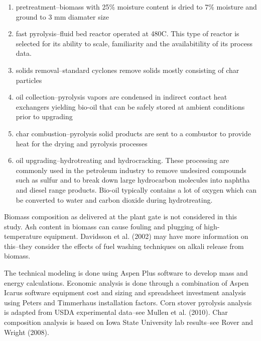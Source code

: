 \documentclass{article}\usepackage[]{graphicx}\usepackage[]{color}
\begin{document}
\begin{enumerate}
\item pretreatment--biomass with 25\% moisture content is dried to 7\% moisture and ground to 3 mm diamater size
\item fast pyrolysis--fluid bed reactor operated at 480\degree C.  This type of reactor is selected for its ability to scale, familiarity and the availabitility of its process data.
\item solids removal--standard cyclones remove solids mostly consisting of char particles
\item oil collection--pyrolysis vapors are condensed in indirect contact heat exchangers yielding bio-oil that can be safely stored at ambient conditions prior to upgrading
\item char combustion--pyrolysis solid products are sent to a combustor to provide heat for the drying and pyrolysis processes
\item oil upgrading--hydrotreating and hydrocracking.  These processing are commonly used in the petroleum industry to remove undesired compounds such as sulfur and to break down large hydrocarbon molecules into naphtha and diesel range products.  Bio-oil typically contains a lot of oxygen which can be converted to water and carbon dioxide during hydrotreating.
\end{enumerate}

Biomass composition as delivered at the plant gate is not considered in this study.  Ash content in biomass can cause fouling and plugging of high-temperature equipment.  Davidsson et al. (2002) may have more information on this--they consider the effects of fuel washing techniques on alkali release from biomass.

The technical modeling is done using Aspen Plus software to develop mass and energy calculations.  Economic analysis is done through a combination of Aspen Icarus software equipment cost and sizing and spreadsheet investment analysis using Peters and Timmerhaus installation factors.  Corn stover pyrolysis analysis is adapted from USDA experimental data--see Mullen et al. (2010).  Char composition analysis is based on Iowa State University lab results--see Rover and Wright (2008).  
\end{document}
